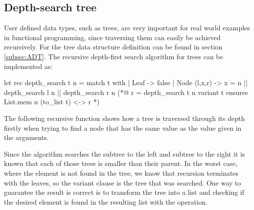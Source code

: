 





\subsection{Depth-search tree}

User defined data types, such as trees, are very important for real world examples in functional programming, since traversing them
can easily be achieved recursively. For the tree data structure definition can be found in section \ref{subsec:ADT}. The recursive 
depth-first search algorithm for trees can be implemented as:

\begin{gospell}
let rec depth_search t n = 
  match t with
  | Leaf -> false
  | Node (l,x,r) -> x = n || depth_search l n || depth_search r n
(*@
  r = depth_search t n
  variant t
  ensures List.mem n (to_list t) <-> r
*)
\end{gospell}

The following recursive function  shows how a tree is traversed through its depth firstly when trying to find
a node that has the same value as the value given in the arguments.

Since the algorithm searches the subtree to the left and subtree to the right it is known that each of those trees is smaller than their
parent. In the worst case, where the element is not found in the tree, we know that recursion terminates with the leaves, so the variant 
clause is the tree that was searched. One way to guarantee the result is correct is to transform the tree into a list and checking if
the desired element is found in the resulting list with the  operation.

